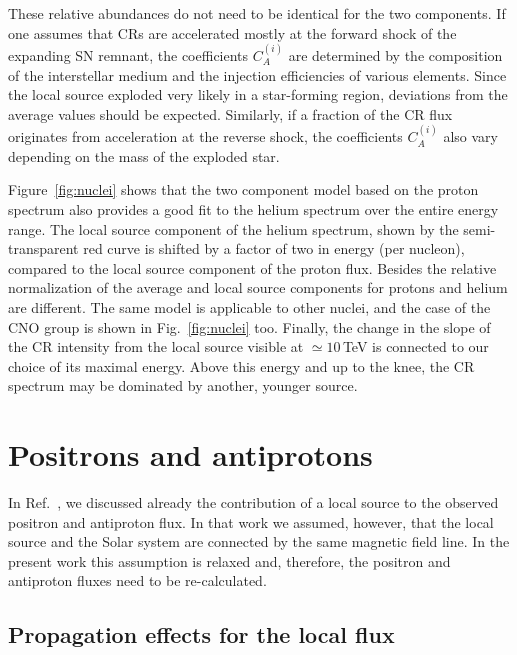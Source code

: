 \documentclass[prd,aps,twocolumn]{revtex4}
\begin{document}
These relative abundances do not need to be identical for the two components. 
If one assumes that  
CRs are accelerated mostly at the forward shock of the expanding SN remnant, 
the coefficients $C^{(i)}_A$  are determined by the composition 
of the interstellar medium and the injection efficiencies of various 
elements. Since the local source exploded very likely in a star-forming 
region, deviations from the average values should be expected. Similarly, 
if a fraction of the CR flux originates from acceleration at the reverse 
shock, the  coefficients $C^{(i)}_A$ also vary depending on the 
mass of the exploded star.



Figure~\ref{fig:nuclei} shows that the two component model based on the
 proton spectrum also provides a good fit to the helium spectrum over the 
entire energy range. The local source component of the helium spectrum, 
shown by the semi-transparent red curve is shifted by a factor of two in 
energy (per nucleon), compared to the local source component of the proton 
flux. Besides the relative normalization of the average and local source 
components for protons and helium are different. The same model is applicable 
to other nuclei, and the case of the CNO group is shown in 
Fig.~\ref{fig:nuclei} too. 
Finally, the change in the slope of the CR intensity from the local source
visible at $\simeq 10$\,TeV is connected to our choice of its maximal energy.
Above this energy and up to the knee, the CR spectrum may be dominated by
another, younger source.




\section{Positrons and antiprotons}


In Ref.~\cite{PRL}, we discussed already the contribution of a local
source to the observed positron and antiproton flux. In that work
we assumed, however, that the local source and the Solar system are
connected by the same magnetic field line. In the present work this 
assumption is relaxed and, therefore, the positron and antiproton fluxes 
need to be re-calculated. 



\subsection{Propagation effects for the local flux}
\end{document}
